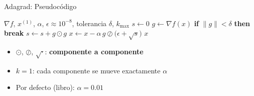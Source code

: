 \begin{frame}{Adagrad: Pseudocódigo}
    \scriptsize
    \begin{algorithmic}[1]
        \Require $\nabla f$, $x^{(1)}$, $\alpha$, $\epsilon\approx10^{-8}$, tolerancia $\delta$, $k_{\max}$
        \State $s \gets 0$
            \State $g \gets \nabla f(x)$
            \State \textbf{if} $\lVert g \rVert < \delta$ \textbf{then break}
            \State $s \gets s + g \odot g$ 
            \State $x \gets x - \alpha\, g \oslash \bigl(\epsilon + \sqrt{s}\bigr)$ 
        \EndFor
        \State \Return $x$
    \end{algorithmic}

    \vspace{1em}
    \small
    \begin{itemize}
        \item $\odot$, $\oslash$, $\sqrt{\cdot}$: \textbf{componente a componente}
        \item $k=1$: cada componente se mueve exactamente $\alpha$
        \item Por defecto (libro): $\alpha=0.01$
    \end{itemize}
\end{frame}

